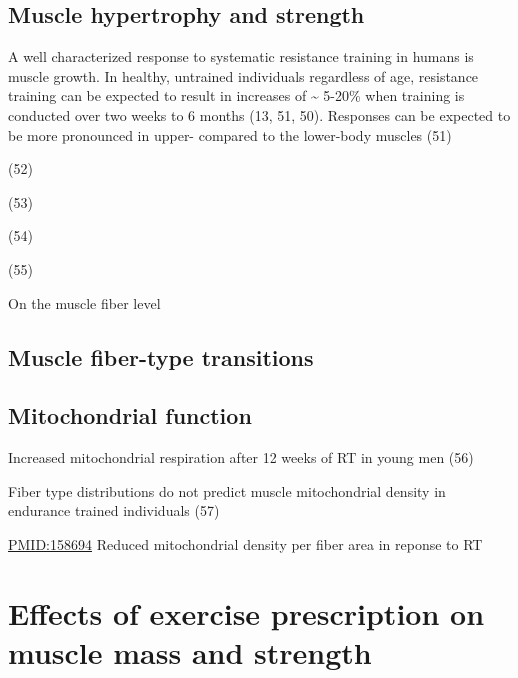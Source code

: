 \documentclass[twoside,10pt]{gihclass} %
\begin{document}
\hypertarget{muscle-hypertrophy-and-strength}{%
\subsection{Muscle hypertrophy and strength}\label{muscle-hypertrophy-and-strength}}

A well characterized response to systematic resistance training in humans is muscle growth. In healthy, untrained individuals regardless of age, resistance training can be expected to result in increases of \textasciitilde{} 5-20\% when training is conducted over two weeks to 6 months
(13, 51, 50).
Responses can be expected to be more pronounced in upper- compared to the lower-body muscles
(51)

(52)

(53)

(54)

(55)

On the muscle fiber level

\hypertarget{muscle-fiber-type-transitions}{%
\subsection{Muscle fiber-type transitions}\label{muscle-fiber-type-transitions}}

\hypertarget{mitochondrial-function}{%
\subsection{Mitochondrial function}\label{mitochondrial-function}}

Increased mitochondrial respiration after 12 weeks of RT in young men (56)

Fiber type distributions do not predict muscle mitochondrial density in endurance trained individuals (57)

\url{PMID:158694} Reduced mitochondrial density per fiber area in reponse to RT

\hypertarget{effects-of-exercise-prescription-on-muscle-mass-and-strength}{%
\section{Effects of exercise prescription on muscle mass and strength}\label{effects-of-exercise-prescription-on-muscle-mass-and-strength}}
\end{document}
